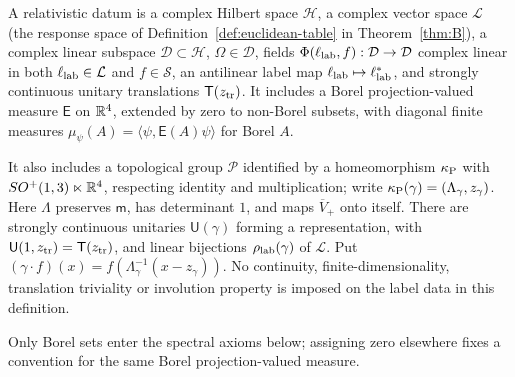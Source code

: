 \begin{definition}\label{def:relativistic-data}
A relativistic datum is a complex Hilbert space $\mathcal H$, a complex vector space $\mathcal L$ (the response space of Definition~\ref{def:euclidean-table} in Theorem~\ref{thm:B}), a complex linear subspace $\mathcal D\subset\mathcal H$, $\Omega\in\mathcal D$, fields $\Phi(\ell_{\rm lab},f):\mathcal D\to\mathcal D$ complex linear in both $\ell_{\rm lab}\in\mathcal L$ and $f\in\mathcal S$, an antilinear label map $\ell_{\rm lab}\mapsto\ell_{\rm lab}^*$, and strongly continuous unitary translations $\mathsf T(z_{\rm tr})$. It includes a Borel projection-valued measure $\mathsf E$ on $\mathbb{R}^4$, extended by zero to non-Borel subsets, with diagonal finite measures $\mu_\psi(A)=\langle\psi,\mathsf E(A)\psi\rangle$ for Borel $A$.

It also includes a topological group $\mathcal P$ identified by a homeomorphism $\kappa_{\rm P}$ with $SO^+(1,3)\ltimes\mathbb{R}^4$, respecting identity and multiplication; write $\kappa_{\rm P}(\gamma)=(\Lambda_\gamma,z_\gamma)$. Here $\Lambda$ preserves $\mathsf m$, has determinant $1$, and maps $\overline V_+$ onto itself. There are strongly continuous unitaries $\mathsf U(\gamma)$ forming a representation, with $\mathsf U(1,z_{\rm tr})=\mathsf T(z_{\rm tr})$, and linear bijections $\rho_{\rm lab}(\gamma)$ of $\mathcal L$. Put $(\gamma\cdot f)(x)=f(\Lambda_\gamma^{-1}(x-z_\gamma))$. No continuity, finite-dimensionality, translation triviality or involution property is imposed on the label data in this definition.
\end{definition}

Only Borel sets enter the spectral axioms below; assigning zero elsewhere fixes a convention for the same Borel projection-valued measure.

